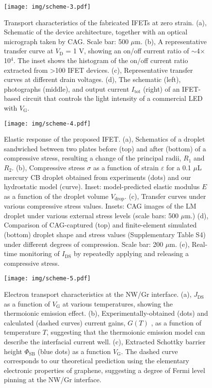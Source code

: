 \documentclass[journal=nalefd,manuscript=letter,email=true,hyperref=true,keywords=true]{achemso}
\begin{document}
\begin{figure}[htbp]
\centering
\texttt{[image: img/scheme-3.pdf]}
\caption{\label{fig:main-3}
Transport characteristics of the fabricated IFETs at zero strain. (a), Schematic of the device architecture, together with an optical micrograph taken by CAG. Scale bar: 500 \(\mu\)m. (b), A representative transfer curve at \(V_{\mathrm{D}}\) = 1 V, showing an on/off current ratio of \(\sim\)4\(\times{}\)10\(^{\text{4}}\). The inset shows the histogram of the on/off current ratio extracted from \textgreater{}100 IFET devices. (c), Representative transfer curves at different drain voltages. (d), The schematic (left), photographs (middle), and output current \(I_{\mathrm{tot}}\) (right) of an IFET-based circuit that controls the light intensity of a commercial LED with \(V_{\mathrm{G}}\).}
\end{figure}


\begin{figure}[htbp]
\centering
\texttt{[image: img/scheme-4.pdf]}
\caption{\label{fig:main-4}
Elastic response of the proposed IFET. (a), Schematics of a droplet sandwiched between two plates before (top) and after (bottom) of a compressive stress, resulting a change of the principal radii, \(R_{1}\) and \(R_{2}\). (b), Compressive stress \(\sigma\) as a function of strain \(\varepsilon\) for a 0.1 \(\mu\)L mercury CB droplet obtained from experiments (dots) and our hydrostatic model (curve). Inset: model-predicted elastic modulus \(E\) as a function of the droplet volume \(V_{\mathrm{drop}}\). (c), Transfer curves under various compressive stress values. Insets: CAG images of the LM droplet under various external stress levels (scale bars: 500 \(\mu\)m.) (d), Comparison of CAG-captured (top) and finite-element simulated (bottom) droplet shape and stress values (Supplementary Table S4) under different degrees of compression. Scale bar: 200 \(\mu\)m. (e), Real-time monitoring of \(I_{\mathrm{DS}}\) by repeatedly applying and releasing a compressive stress.}
\end{figure}


\begin{figure}[htbp]
\centering
\texttt{[image: img/scheme-5.pdf]}
\caption{\label{fig:main-5}
Electron transport characteristics at the NW/Gr interface. (a), \(J_{\mathrm{DS}}\) as a function of \(V_{\mathrm{G}}\) at various temperatures, showing the thermoionic emission effect. (b), Experimentally-obtained (dots) and calculated (dashed curves) current gains, \(G(T)\) , as a function of temperature \(T\), suggesting that the thermoionic emission model can describe the interfacial current well. (c), Extracted Schottky barrier height \(\Phi_{\mathrm{SB}}\) (blue dots) as a function \(V_{\mathrm{G}}\). The dashed curve corresponds to our theoretical prediction using the elementary electronic properties of graphene, suggesting a degree of Fermi level pinning at the NW/Gr interface.}
\end{figure}
\end{document}
